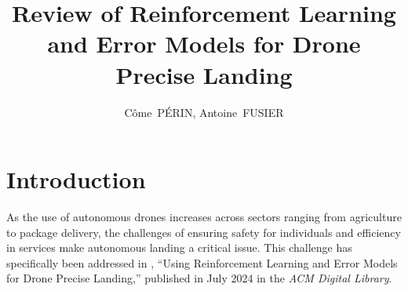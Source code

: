 \documentclass[10pt,journal,compsoc]{IEEEtran}
\begin{document}
%

\title{Review of Reinforcement Learning and Error Models for Drone Precise Landing}

\author{Côme~PÉRIN,
        Antoine~FUSIER}%



\maketitle


\IEEEdisplaynontitleabstractindextext
\IEEEpeerreviewmaketitle



\section{Introduction}\label{sec:introduction}
As the use of autonomous drones increases across sectors ranging from agriculture to package delivery, the challenges of ensuring safety for individuals and efficiency in services make autonomous landing a critical issue. This challenge has specifically been addressed in \cite{studied}, ``Using Reinforcement Learning and Error Models for Drone Precise Landing,'' published in July 2024 in the \textit{ACM Digital Library}.
\end{document}
